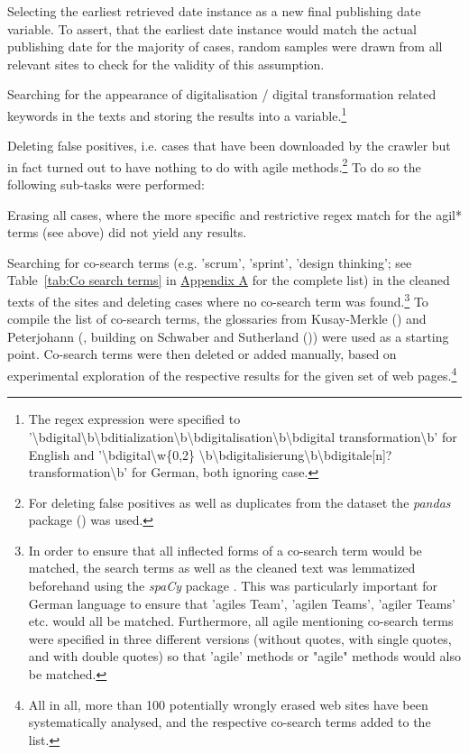 \begin{compactitem}
\item Selecting the earliest retrieved date instance as a new final publishing date variable. To assert, that the earliest date instance would match the actual publishing date for the majority of cases, random samples were drawn from all relevant sites to check for the validity of this assumption. 
\item Searching for the appearance of digitalisation / digital transformation related keywords in the texts and storing the results into a variable.\footnote{The regex expression were specified to '\textbackslash bdigital\textbackslash b\textbar \textbackslash bditialization\textbackslash b\textbar \textbackslash bdigitalisation\textbackslash b\textbar \textbackslash bdigital transformation\textbackslash b' for English and '\textbackslash bdigital\textbackslash w\{0,2\} \textbackslash b\textbar \textbackslash bdigitalisierung\textbackslash b\textbar \textbackslash bdigitale[n]? transformation\textbackslash b' for German, both ignoring case.}
\item Deleting false positives, i.e. cases that have been downloaded by the crawler but in fact turned out to have nothing to do with agile methods.\footnote{For deleting false positives as well as duplicates from the dataset the \textit{pandas} package (\cite{McKinney2010}) was used.} To do so the following sub-tasks were performed:
    \begin{compactitem}
    \item Erasing all cases, where the more specific and restrictive regex match for the agil* terms (see above) did not yield any results. 
    \item Searching for co-search terms (e.g. 'scrum', 'sprint', 'design thinking'; see Table~\ref{tab:Co search terms} in \href{Appendix A}{Appendix A} for the complete list) in the cleaned texts of the sites and deleting cases where no co-search term was found.\footnote{In order to ensure that all inflected forms of a co-search term would be matched, the search terms as well as the cleaned text was lemmatized beforehand using the \textit{spaCy} package \parencite{honnibal-johnson:2015:EMNLP}. This was particularly important for German language to ensure that 'agiles Team', 'agilen Teams', 'agiler Teams' etc. would all be matched. Furthermore, all agile mentioning co-search terms were specified in three different versions (without quotes, with single quotes, and with double quotes) so that 'agile' methods or "agile" methods would also be matched.} To compile the list of co-search terms, the glossaries from Kusay-Merkle (\cite*{Kusay-Merkle2018}) and Peterjohann (\cite*{Peterjohann2020}, building on Schwaber  and  Sutherland (\cite*{Schwaber2020})) were used as a starting point. Co-search terms were then deleted or added manually, based on experimental exploration of the respective results for the given set of web pages.\footnote{All in all, more than 100 potentially wrongly erased web sites have been systematically analysed, and the respective co-search terms added to the list.} 

\end{compactitem}
\end{compactitem}
